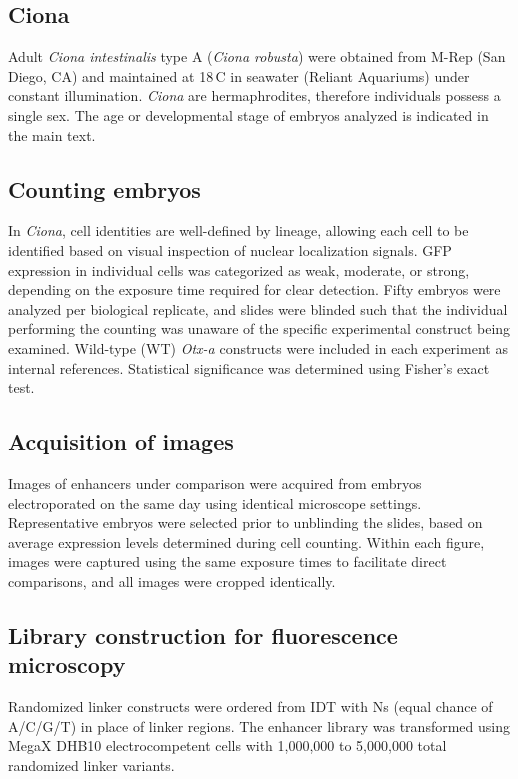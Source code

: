 \subsection{Ciona}

Adult \textit{Ciona intestinalis} type A (\textit{Ciona robusta}) were obtained from M-Rep (San Diego, CA) and maintained at 18\,\textdegree C in seawater (Reliant Aquariums) under constant illumination. \textit{Ciona} are hermaphrodites, therefore individuals possess a single sex. The age or developmental stage of embryos analyzed is indicated in the main text.

\subsection{Counting embryos}

In \textit{Ciona}, cell identities are well-defined by lineage, allowing each cell to be identified based on visual inspection of nuclear localization signals. GFP expression in individual cells was categorized as weak, moderate, or strong, depending on the exposure time required for clear detection. Fifty embryos were analyzed per biological replicate, and slides were blinded such that the individual performing the counting was unaware of the specific experimental construct being examined. Wild-type (WT) \textit{Otx-a} constructs were included in each experiment as internal references. Statistical significance was determined using Fisher’s exact test.

\subsection{Acquisition of images}

Images of enhancers under comparison were acquired from embryos electroporated on the same day using identical microscope settings. Representative embryos were selected prior to unblinding the slides, based on average expression levels determined during cell counting. Within each figure, images were captured using the same exposure times to facilitate direct comparisons, and all images were cropped identically.

\subsection{Library construction for fluorescence microscopy}

Randomized linker constructs were ordered from IDT with Ns (equal chance of A/C/G/T) in place of linker regions. The enhancer library was transformed using MegaX DHB10 electrocompetent cells with 1,000,000 to 5,000,000 total randomized linker variants.

